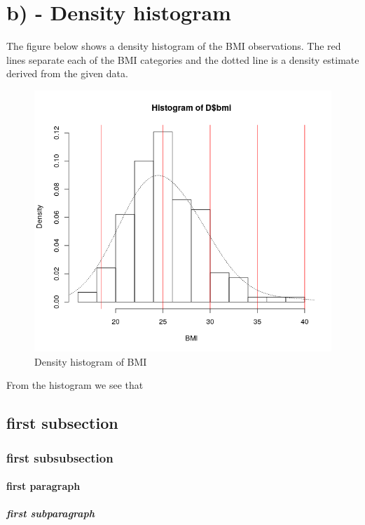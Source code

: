 \documentclass{memoir}
\begin{document}
\section{b) - Density histogram}
The figure below shows a density histogram of the BMI observations. The red lines separate each of the BMI categories and the dotted line is a density estimate derived from the given data. 
\begin{figure}[H]
	\centering
	\includegraphics[scale=0.7]{histBMI.png}
	\caption{Density histogram of BMI}
\end{figure}

From the histogram we see that 

\subsection{first subsection}

\subsubsection{first subsubsection}

\paragraph{first paragraph}

\subparagraph{first subparagraph}






%
%
\end{document}
